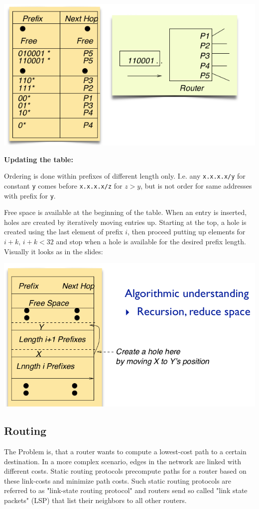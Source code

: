 \includegraphics[width=.7\textwidth]{images/chap4/Ternary_CAM.png}

\textbf{Updating the table:} 

Ordering is done within prefixes of different length only. I.e. any \texttt{x.x.x.x/y} for constant \texttt{y} comes before \texttt{x.x.x.x/z} for $z > y$, but is not order for same addresses with prefix for \texttt{y}.

Free space is available at the beginning of the table. When an entry is inserted, holes are created by iteratively moving entries up. Starting at the top, a hole is created using the last element of prefix $i$, then proceed putting up elements for $i+k$, $i+k < 32$ and stop when a hole is available for the desired prefix length. Visually it looks as in the slides:

\includegraphics[width=.7\textwidth]{images/chap4/Ternary_CAM_update}

\subsection{Routing}

The Problem is, that a router wants to compute a lowest-cost path to a certain destination. In a more complex scenario, edges in the network are linked with different costs. Static routing protocols precompute paths for a router based on these link-costs and minimize path costs. Such static routing protocols are referred to as "link-state routing protocol" and routers send so called "link state packets" (LSP) that list their neighbors to all other routers.

